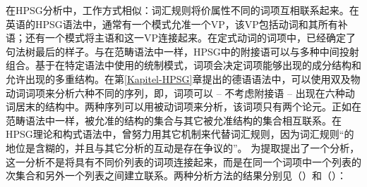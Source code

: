 在HPSG\hpsgc 分析\indexhpsgc 中，工作方式相似：词汇规则将价属性不同的词项互相联系起来。在英语的HPSG语法中，通常有一个模式允准一个VP，该VP包括动词和其所有补语；还有一个模式将主语和这一VP连接起来\citep[]{ps2}。在定式动词的词项中，已经确定了句法树最后的样子。与在范畴语法中一样，HPSG中的附接语可以与多种中间投射组合。基于在特定语法中使用的统制模式，词项会决定词项能够出现的成分结构和允许出现的多重结构。在第\ref{Kapitel-HPSG}章提出的德语语法中，可以使用双及物动词词项来分析六种不同的序列，即，词项可以 -- 不考虑附接语 -- 出现在六种动词居末的结构中。两种序列可以用被动词项来分析，该词项只有两个论元。正如在范畴语法中一样，被允准的结构的集合与其它被允准结构的集合相互联系。在HPSG理论和构式语法中，曾努力用其它机制来代替词汇规则，因为词汇规则“的地位是含糊的，并且与其它分析的互动是存在争议的”\citep*[]{BMS2001a}。\citet{BMS2001a} 为提取提出了一个分析，这一分析不是将具有不同价列表的词项连接起来，而是在同一个词项中一个列表的次集合和另外一个列表之间建立联系。两种分析方法的结果分别见（）和（）：
